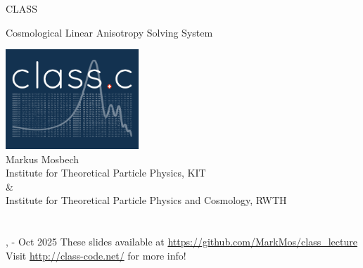 
\begin{frame}

\begin{block}{
\begin{center}\Large CLASS\end{center}}
\begin{center}\small Cosmological Linear Anisotropy Solving System \end{center}
\end{block}

\scriptsize

\begin{center}
	\includegraphics[width=5cm,angle=0]{Figures/Logo1b_blue.pdf}\\
	Markus Mosbech\\
	Institute for Theoretical Particle Physics, KIT\\
	\&\\
	Institute for Theoretical Particle Physics and Cosmology, RWTH\\
	\mbox{}\\
	\mbox{}\\
	\location, \ecolefromdate{}-\ecoletodate{} Oct 2025
	\vfill
	These slides available at \url{https://github.com/MarkMos/class_lecture}\\
	Visit \url{http://class-code.net/} for more info!
\end{center}

\end{frame}
